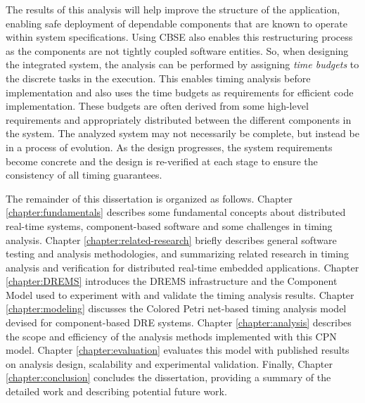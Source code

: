 The results of this analysis will help improve the structure of the application, enabling safe deployment of dependable components that are known to operate within system specifications. Using CBSE also enables this restructuring process as the components are not tightly coupled software entities. So, when designing the integrated system, the analysis can be performed by assigning \emph{time budgets} to the discrete tasks in the execution. This enables timing analysis before implementation and also uses the time budgets as requirements for efficient code implementation. These budgets are often derived from some high-level requirements and appropriately distributed between the different components in the system. The analyzed system may not necessarily be complete, but instead be in a process of evolution. As the design progresses, the system requirements become concrete and the design is re-verified at each stage to ensure the consistency of all timing guarantees. 

The remainder of this dissertation is organized as follows. Chapter \ref{chapter:fundamentals} describes some fundamental concepts about distributed real-time systems, component-based software and some challenges in timing analysis. Chapter \ref{chapter:related-research} briefly describes general software testing and analysis methodologies, and summarizing related research in timing analysis and verification for distributed real-time embedded applications. Chapter \ref{chapter:DREMS} introduces the DREMS infrastructure and the Component Model used to experiment with and validate the timing analysis results. Chapter \ref{chapter:modeling} discusses the Colored Petri net-based timing analysis model devised for component-based DRE systems. Chapter \ref{chapter:analysis} describes the scope and efficiency of the analysis methods implemented with this CPN model. Chapter \ref{chapter:evaluation} evaluates this model with published results on analysis design, scalability and experimental validation. Finally, Chapter \ref{chapter:conclusion} concludes the dissertation, providing a summary of the detailed work and describing potential future work.